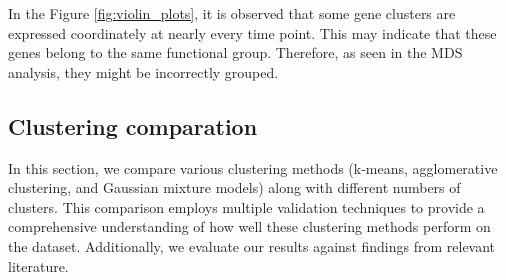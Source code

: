\documentclass{article}
\begin{document}
In the Figure \ref{fig:violin_plots}, it is observed that some gene clusters are expressed coordinately at nearly every time point. This may indicate that these genes belong to the same functional group. Therefore, as seen in the MDS analysis, they might be incorrectly grouped. 

\subsection{Clustering comparation}

In this section, we compare various clustering methods (k-means, agglomerative clustering, and Gaussian mixture models) along with different numbers of clusters. This comparison employs multiple validation techniques to provide a comprehensive understanding of how well these clustering methods perform on the dataset. Additionally, we evaluate our results against findings from relevant literature.

\begin{lstlisting}[style=mypython, caption=Violin Plots of Variables by Cluster, label=lst:violin]

\end{lstlisting}
\end{document}
